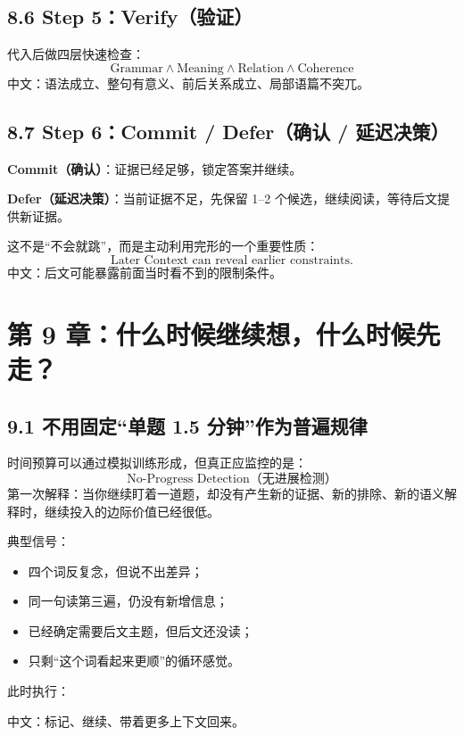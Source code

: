 \documentclass[11pt,a4paper]{ctexart}
\newcommand{\term}[2]{\textbf{#1（#2）}}
\begin{document}
\subsection{8.6 Step 5：Verify（验证）}
代入后做四层快速检查：
\[
\boxed{
\text{Grammar}
\land
\text{Meaning}
\land
\text{Relation}
\land
\text{Coherence}
}
\]
中文：语法成立、整句有意义、前后关系成立、局部语篇不突兀。

\subsection{8.7 Step 6：Commit / Defer（确认 / 延迟决策）}
\term{Commit}{确认}：证据已经足够，锁定答案并继续。

\term{Defer}{延迟决策}：当前证据不足，先保留 1--2 个候选，继续阅读，等待后文提供新证据。

这不是“不会就跳”，而是主动利用完形的一个重要性质：
\[
\boxed{\text{Later Context can reveal earlier constraints.}}
\]
中文：后文可能暴露前面当时看不到的限制条件。

\section{第 9 章：什么时候继续想，什么时候先走？}

\subsection{9.1 不用固定“单题 1.5 分钟”作为普遍规律}
时间预算可以通过模拟训练形成，但真正应监控的是：
\[
\boxed{\text{No-Progress Detection（无进展检测）}}
\]
第一次解释：当你继续盯着一道题，却没有产生新的证据、新的排除、新的语义解释时，继续投入的边际价值已经很低。

典型信号：
\begin{itemize}
  \item 四个词反复念，但说不出差异；
  \item 同一句读第三遍，仍没有新增信息；
  \item 已经确定需要后文主题，但后文还没读；
  \item 只剩“这个词看起来更顺”的循环感觉。
\end{itemize}

此时执行：
\begin{center}
\end{center}
中文：标记、继续、带着更多上下文回来。
\end{document}
